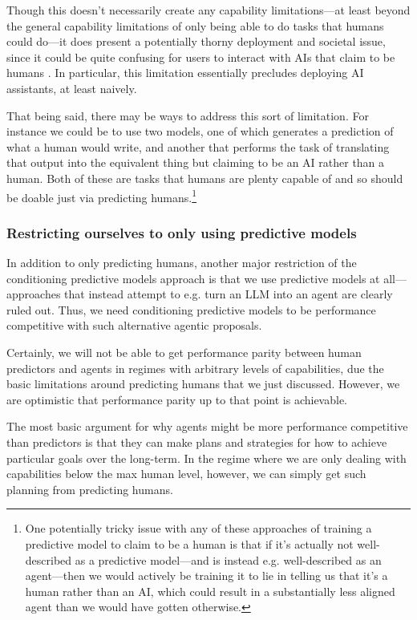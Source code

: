 \documentclass[
  onecolumn,
  nonatbib,
]{miri-tech-article}
\begin{document}
Though this doesn't necessarily create any capability limitations---at least beyond the general capability limitations of only being able to do tasks that humans could do---it does present a potentially thorny deployment and societal issue, since it could be quite confusing for users to interact with AIs that claim to be humans \cite{eu_ai_act}.
In particular, this limitation essentially precludes deploying AI assistants, at least naively.

That being said, there may be ways to address this sort of limitation. For instance we could be to use two models, one of which generates a prediction of what a human would write, and another that performs the task of translating that output into the equivalent thing but claiming to be an AI rather than a human.
Both of these are tasks that humans are plenty capable of and so should be doable just via predicting humans.\footnote{One potentially tricky issue with any of these approaches of training a predictive model to claim to be a human is that if it's actually not well-described as a predictive model---and is instead e.g. well-described as an agent---then we would actively be training it to lie in telling us that it's a human rather than an AI, which could result in a substantially less aligned agent than we would have gotten otherwise.}


\subsubsection{Restricting ourselves to only using predictive models}\label{subsubsec:restricting_ourselves_to_only_using_predictive_models}

In addition to only predicting humans, another major restriction of the conditioning predictive models approach is that we use predictive models at all---approaches that instead attempt to e.g. turn an LLM into an agent are clearly ruled out. Thus, we need conditioning predictive models to be performance competitive with such alternative agentic proposals.

Certainly, we will not be able to get performance parity between human predictors and agents in regimes with arbitrary levels of capabilities, due the basic limitations around predicting humans that we just discussed. However, we are optimistic that performance parity up to that point is achievable.

The most basic argument for why agents might be more performance competitive than predictors is that they can make plans and strategies for how to achieve particular goals over the long-term. In the regime where we are only dealing with capabilities below the max human level, however, we can simply get such planning from predicting humans.
\end{document}
